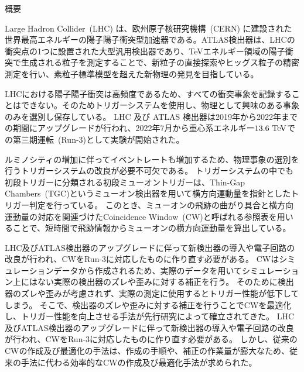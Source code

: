 \begin{center}
  \begin{huge}
    概要
  \end{huge}
\end{center}

\vspace{10pt}

Large Hadron Collider~(LHC) は、欧州原子核研究機構~(CERN) に建設された世界最高エネルギーの陽子陽子衝突型加速器である。ATLAS検出器は、LHCの衝突点の1つに設置された大型汎用検出器であり、TeVエネルギー領域の陽子衝突で生成される粒子を測定することで、新粒子の直接探索やヒッグス粒子の精密測定を行い、素粒子標準模型を超えた新物理の発見を目指している。

LHCにおける陽子陽子衝突は高頻度であるため、すべての衝突事象を記録することはできない。そのためトリガーシステムを使用し、物理として興味のある事象のみを選別し保存している。
LHC 及び ATLAS 検出器は2019年から2022年までの期間にアップグレードが行われ、2022年7月から重心系エネルギー$13.6~{\rm TeV}$での第三期運転~(Run-3)として実験が開始された。

ルミノシティの増加に伴ってイベントレートも増加するため、物理事象の選別を行うトリガーシステムの改良が必要不可欠である。
トリガーシステムの中でも初段トリガーに分類される初段ミューオントリガーは、Thin-Gap Chambers~(TGC)というミューオン検出器を用いて横方向運動量を指針としたトリガー判定を行っている。
このとき、ミューオンの飛跡の曲がり具合と横方向運動量の対応を関連づけたCoincidence Window~(CW)と呼ばれる参照表を用いることで、短時間で飛跡情報からミューオンの横方向運動量を算出している。

LHC及びATLAS検出器のアップグレードに伴って新検出器の導入や電子回路の改良が行われ、CWをRun-3に対応したものに作り直す必要がある。
CWはシミュレーションデータから作成されるため、実際のデータを用いてシミュレーション上にはない実際の検出器のズレや歪みに対する補正を行う。
そのために検出器のズレや歪みが考慮されず、実際の測定に使用するとトリガー性能が低下してしまう。
そこで、検出器のズレや歪みに対する補正を行うことでCWを最適化し、トリガー性能を向上させる手法が先行研究によって確立されてきた。
LHC及びATLAS検出器のアップグレードに伴って新検出器の導入や電子回路の改良が行われ、CWをRun-3に対応したものに作り直す必要がある。
しかし、従来のCWの作成及び最適化の手法は、作成の手順や、補正の作業量が膨大なため、従来の手法に代わる効率的なCWの作成及び最適化手法が求められた。

